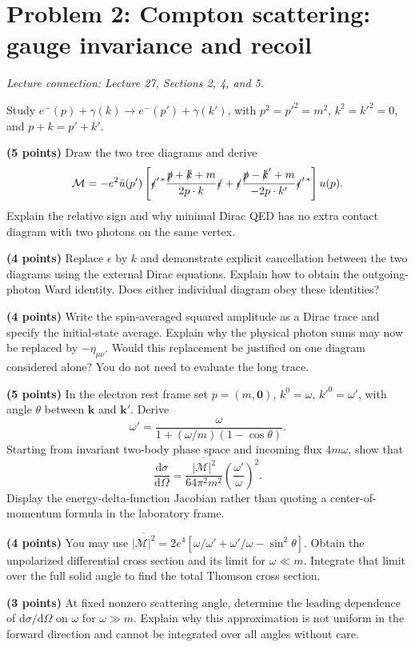 \documentclass[11pt]{article}
\newcommand{\dd}{\mathrm d}
\newcommand{\cM}{\mathcal M}
\newcommand{\problem}[2]{\clearpage\section*{\color{qftblue}Problem #1: #2}}
\newcommand{\connection}[1]{{\small\textit{Lecture connection: #1}\par}\medskip}
\begin{document}
\problem{2}{Compton scattering: gauge invariance and recoil}
\connection{Lecture 27, Sections 2, 4, and 5.}
Study \(e^-(p)+\gamma(k)\to e^-(p')+\gamma(k')\), with
\(p^2=p'^2=m^2\), \(k^2=k'^2=0\), and \(p+k=p'+k'\).
\begin{parts}
\item \textbf{(5 points)} Draw the two tree diagrams and derive
\[
 \cM=-e^2\bar u(p')\left[
 \slashed\epsilon'^{\,*}\frac{\slashed p+\slashed k+m}{2p\cdot k}
 \slashed\epsilon+
 \slashed\epsilon\frac{\slashed p-\slashed k'+m}{-2p\cdot k'}
 \slashed\epsilon'^{\,*}\right]u(p).
\]
Explain the relative sign and why minimal Dirac QED has no extra
contact diagram with two photons on the same vertex.

\item \textbf{(4 points)} Replace \(\epsilon\) by \(k\) and demonstrate
explicit cancellation between the two diagrams using the external
Dirac equations. Explain how to obtain the outgoing-photon Ward identity.
Does either individual diagram obey these identities?

\item \textbf{(4 points)} Write the spin-averaged squared amplitude as
a Dirac trace and specify the initial-state average. Explain why the
physical photon sums may now be replaced by \(-\eta_{\mu\nu}\).
Would this replacement be justified on one diagram considered alone?
You do not need to evaluate the long trace.

\item \textbf{(5 points)} In the electron rest frame set
\(p=(m,\bm0)\), \(k^0=\omega\), \(k'^0=\omega'\), with angle
\(\theta\) between \(\bm k\) and \(\bm k'\). Derive
\[
 \omega'=\frac{\omega}{1+(\omega/m)(1-\cos\theta)}.
\]
Starting from invariant two-body phase space and incoming flux
\(4m\omega\), show that
\[
 \frac{\dd\sigma}{\dd\Omega}
 =\frac{\overline{|\cM|^2}}{64\pi^2m^2}
 \left(\frac{\omega'}{\omega}\right)^2.
\]
Display the energy-delta-function Jacobian rather than quoting a
center-of-momentum formula in the laboratory frame.

\item \textbf{(4 points)} You may use
\(\overline{|\cM|^2}=2e^4[\omega/\omega'+\omega'/\omega-\sin^2\theta]\).
Obtain the unpolarized differential cross section and its limit for
\(\omega\ll m\). Integrate that limit over the full solid angle to find
the total Thomson cross section.

\item \textbf{(3 points)} At fixed nonzero scattering angle, determine
the leading dependence of \(\dd\sigma/\dd\Omega\) on \(\omega\) for
\(\omega\gg m\). Explain why this approximation is not uniform in the
forward direction and cannot be integrated over all angles without care.
\end{parts}
\end{document}
